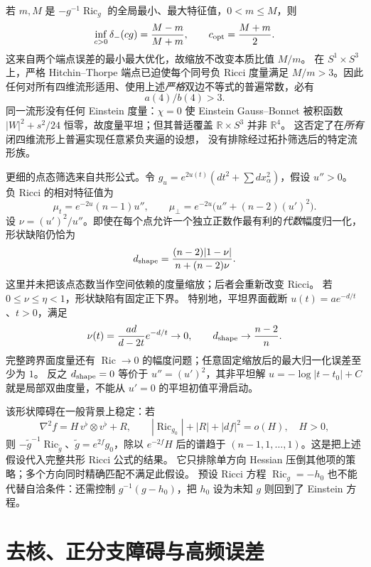\documentclass[UTF8,fontset=fandol,zihao=-4,oneside,openany]{ctexbook}
\theoremstyle{cjkplain}
\numberwithin{equation}{chapter}
\DeclareMathOperator{\Ric}{Ric}
\begin{document}
若 \(m,M\) 是 \(-g^{-1}\Ric_g\) 的全局最小、最大特征值，\(0<m\le M\)，则
\[
\inf_{c>0}\delta_-(cg)=\frac{M-m}{M+m},\qquad c_{\rm opt}=\frac{M+m}{2}.
\]
这来自两个端点误差的最小最大优化，故缩放不改变本质比值 \(M/m\)。
在 \(S^1\times S^3\) 上，严格 Hitchin--Thorpe 端点已迫使每个同号负 Ricci 度量满足
\(M/m>3\)。因此任何对所有四维流形适用、使用上述\emph{严格}双边不等式的普遍常数，必有
\[
a(4)/b(4)>3.
\]
同一流形没有任何 Einstein 度量：\(\chi=0\) 使 Einstein Gauss--Bonnet 被积函数
\(|W|^2+s^2/24\) 恒零，故度量平坦；但其普适覆盖 \(\mathbb R\times S^3\) 并非 \(\mathbb R^4\)。
这否定了在\emph{所有}闭四维流形上普遍实现任意紧负夹逼的设想，
没有排除经过拓扑筛选后的特定流形族。

更细的点态筛选来自共形公式。令
\(g_u=e^{2u(t)}(dt^2+\sum dx_\alpha^2)\)，假设 \(u''>0\)。
负 Ricci 的相对特征值为
\[
\mu_t=e^{-2u}(n-1)u'',\qquad
\mu_\perp=e^{-2u}\bigl(u''+(n-2)(u')^2\bigr).
\]
设 \(\nu=(u')^2/u''\)。即使在每个点允许一个独立正数作最有利的\emph{代数}幅度归一化，形状缺陷仍恰为
\[
d_{\rm shape}=\frac{(n-2)|1-\nu|}{n+(n-2)\nu}.
\]
这里并未把该点态数当作空间依赖的度量缩放；后者会重新改变 Ricci。
若 \(0\le\nu\le\eta<1\)，形状缺陷有固定正下界。
特别地，平坦界面截断 \(u(t)=a e^{-d/t}\)、\(t>0\)，满足
\[
\nu(t)=\frac{ad}{d-2t}e^{-d/t}\to0,
\qquad d_{\rm shape}\to\frac{n-2}{n}.
\]
完整跨界面度量还有 \(\Ric\to0\) 的幅度问题；任意固定缩放后的最大归一化误差至少为 \(1\)。
反之 \(d_{\rm shape}=0\) 等价于 \(u''=(u')^2\)，其非平坦解
\(u=-\log|t-t_0|+C\) 就是局部双曲度量，不能从 \(u'=0\) 的平坦初值平滑启动。

该形状障碍在一般背景上稳定：若
\[
\nabla^2f=H\,v^\flat\otimes v^\flat+R,
\qquad|\Ric_{g_0}|+|R|+|df|^2=o(H),\quad H>0,
\]
则 \(-\widetilde g^{-1}\Ric_{\widetilde g}\)、\(\widetilde g=e^{2f}g_0\)，除以 \(e^{-2f}H\) 后的谱趋于
\((n-1,1,\ldots,1)\)。这是把上述假设代入完整共形 Ricci 公式的结果。
它只排除单方向 Hessian 压倒其他项的策略；多个方向同时精确匹配不满足此假设。
预设 Ricci 方程 \(\Ric_g=-h_0\) 也不能代替自洽条件：还需控制
\(g^{-1}(g-h_0)\)，把 \(h_0\) 设为未知 \(g\) 则回到了 Einstein 方程。

\section{去核、正分支障碍与高频误差}
\label{FND:spectralcollapse}
\end{document}
